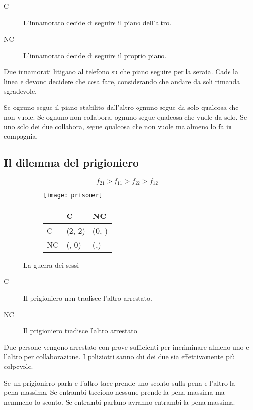 \documentclass[\main/main.tex]{subfiles}
\begin{document}
\begin{description}
  \item[C] L'innamorato decide di seguire il piano dell'altro.
  \item[NC] L'innamorato decide di seguire il proprio piano.
\end{description}

Due innamorati litigano al telefono su che piano seguire per la serata. Cade la linea e devono decidere che cosa fare, considerando che andare da soli rimanda sgradevole.

Se ognuno segue il piano stabilito dall'altro ognuno segue da solo qualcosa che non vuole. Se ognuno non collabora, ognuno segue qualcosa che vuole da solo. Se uno solo dei due collabora, segue qualcosa che non vuole ma almeno lo fa in compagnia.

\subsection{Il dilemma del prigioniero}

\[
  f_{21}>f_{11}>f_{22}>f_{12}
\]

\begin{figure}
  \begin{subfigure}{0.49\textwidth}
    \texttt{[image: prisoner]}
  \end{subfigure}
  \begin{subfigure}{0.49\textwidth}
    \begin{table}
      \begin{tabular}{|L|L|L|}
        \hline
           & C              & NC                    \\
        \hline
        C  & (2, 2)         & (0, )        \\
        \hline
        NC & (, 0) & (,) \\
        \hline
      \end{tabular}
    \end{table}
  \end{subfigure}
  \caption{La guerra dei sessi}
\end{figure}

\begin{description}
  \item[C] Il prigioniero non tradisce l'altro arrestato.
  \item[NC] Il prigioniero tradisce l'altro arrestato.
\end{description}

Due persone vengono arrestato con prove sufficienti per incriminare almeno uno e l'altro per collaborazione. I poliziotti sanno chi dei due sia effettivamente più colpevole.

Se un prigioniero parla e l'altro tace prende uno sconto sulla pena e l'altro la pena massima. Se entrambi tacciono nessuno prende la pena massima ma nemmeno lo sconto. Se entrambi parlano avranno entrambi la pena massima.
\end{document}
